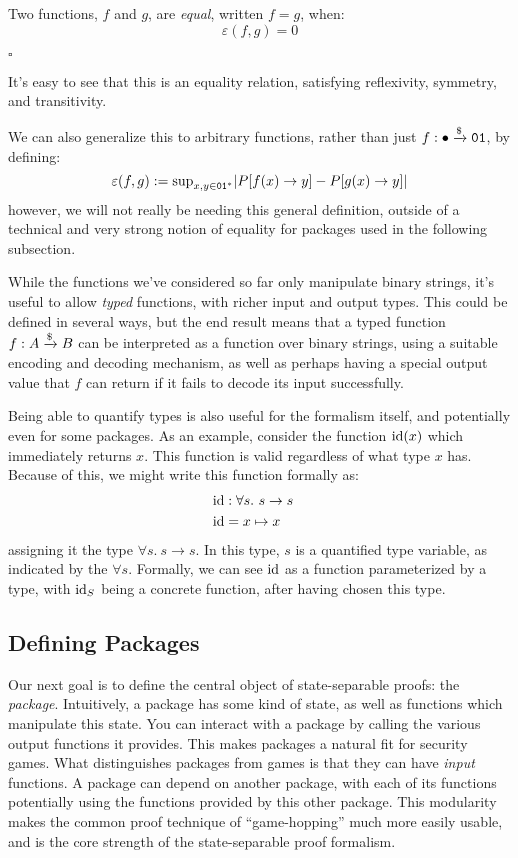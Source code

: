\begin{definition}
    Two functions, $f$ and $g$, are \emph{equal}, written $f = g$, when:
    $$
    \varepsilon(f, g) = 0
    $$

    $\square$
\end{definition}

It's easy to see that this is an equality relation, satisfying
reflexivity, symmetry, and transitivity.

We can also generalize this to arbitrary functions, rather than just
$f : \bullet \xrightarrow{\$} \texttt{01}$, by defining:
$$
\varepsilon(f, g) := \text{sup}_{x, y \in \texttt{01}^*} |P[f(x) \to y] - P[g(x) \to y]|
$$
however, we will not really be needing this general definition, outside
of a technical and very strong notion of equality for packages
used in the following subsection.

While the functions we've considered so far only manipulate binary strings,
it's useful to allow \emph{typed} functions,
with richer input and output types.
This could be defined in several ways, but the end result means
that a typed function $f : A \xrightarrow{\$} B$ can be interpreted as a function
over binary strings, using a suitable encoding and decoding mechanism,
as well as perhaps having a special output value that $f$ can return
if it fails to decode its input successfully.

Being able to quantify types is also useful for the formalism itself,
and potentially even for some packages.
As an example, consider the function $\text{id}(x)$ which immediately
returns $x$.
This function is valid regardless of what type $x$ has.
Because of this, we might write this function formally as:
$$
\begin{aligned}
    &\text{id} : \forall s.\ s \to s\cr
    &\text{id} = x \mapsto x
\end{aligned}
$$
assigning it the type $\forall s.\ s \to s$.
In this type, $s$ is a quantified type variable, as indicated by the $\forall s$.
Formally, we can see $\text{id}$ as a function parameterized by a type,
with $\text{id}_S$ being a concrete function, after having chosen this type.

\subsection{Defining Packages}

Our next goal is to define the central object of state-separable proofs:
the \emph{package}.
Intuitively, a package has some kind of state, as well as functions
which manipulate this state.
You can interact with a package by calling the various output functions
it provides.
This makes packages a natural fit for security games.
What distinguishes packages from games is that they can have \emph{input}
functions.
A package can depend on another package, with each of its functions
potentially using the functions provided by this other package.
This modularity makes the common proof technique of ``game-hopping''
much more easily usable, and is the core strength of the state-separable
proof formalism.

